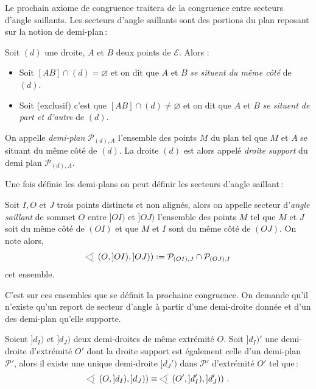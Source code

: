 Le prochain axiome de congruence traitera de la congruence entre secteurs d'angle saillants. Les secteurs d'angle saillants sont des portions du plan reposant sur la notion de demi-plan\,: 
\begin{defi}\label{def-demiplan}
Soit $(d)$ une droite, $A$ et $B$ deux points de $\mathcal{E}$. Alors :
\begin{itemize}[$\bullet$]
    \item Soit $[AB]\cap (d) = \varnothing$ et on dit que $A$ et $B$ \emph{se situent du même côté} de $(d)$.
    \item Soit (exclusif) c'est que $[AB]\cap (d) \neq \varnothing$ et on dit que $A$ et $B$ \emph{se situent de part et d'autre} de $(d)$.
\end{itemize}
On appelle \emph{demi-plan} $\mathcal{P}_{(d),A}$ l'ensemble des points $M$ du plan tel que $M$ et $A$ se situant du même côté de $(d)$. La droite $(d)$ est alors appelé \emph{droite support} du demi plan $\mathcal{P}_{(d),A}$.
\end{defi}
Une fois définie les demi-plans on peut définir les secteurs d'angle saillant\,: 
\begin{defi}\label{defi-anglesaillant}
    Soit $I, O$ et $J$ trois points distincts et non alignés, alors on appelle secteur d'\emph{angle saillant} de sommet $O$ entre $]OI)$ et $]OJ)$ l'ensemble des points $M$ tel que $M$ et $J$ soit du même côté de $(OI)$ et que $M$ et $I$ sont du même côté de $(OJ)$. On note alors,
    \begin{equation*}
        \anglesaillant\left({O},{]OI)},{]OJ)}\right) := \mathcal{P}_{(OI),J} \cap \mathcal{P}_{(OJ),I}  
    \end{equation*}
    cet ensemble. %
\end{defi}
C'est sur ces ensembles que se définit la prochaine congruence. On demande qu'il n'existe qu'un report de secteur d'angle à partir d'une demi-droite donnée et d'un des demi-plan qu'elle supporte. 
\begin{axi}\label{axi-C4}
    Soient $]d_I)$ et $]d_J)$ deux demi-droites de même extrémité $O$. Soit $]d_I)'$ une demi-droite d'extrémité $O'$ dont la droite support est également celle d'un demi-plan $\mathcal{P}'$, alors il existe une unique demi-droite $]d_J')$ dans $\mathcal{P}'$ d'extrémité $O'$ tel que\,:
    $$\anglesaillant\left(O,]d_I),]d_J)\right)\equiv\anglesaillant\left(O',]d_I'),]d_J')\right)\,.$$
\end{axi}
